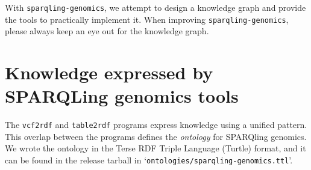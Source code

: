   With \texttt{sparqling-genomics}, we attempt to design a knowledge graph and
  provide the tools to practically implement it.  When improving
  \texttt{sparqling-genomics}, please always keep an eye out for the knowledge
  graph.

\section{Knowledge expressed by SPARQLing genomics tools}

  \begin{sloppypar}
  The \texttt{vcf2rdf} and \texttt{table2rdf} programs express knowledge using
  a unified pattern.  This overlap between the programs defines the
  \emph{ontology} for SPARQling genomics.  We wrote the ontology in the
  Terse RDF Triple Language (Turtle) format, and it can be found in the release
  tarball in \mbox{`\texttt{ontologies/sparqling-genomics.ttl}'}.
  \end{sloppypar}
